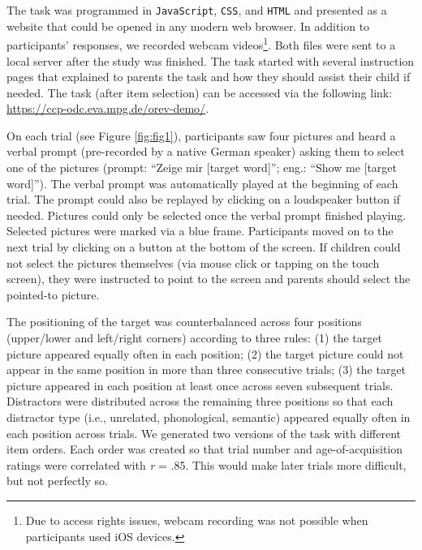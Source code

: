 \documentclass[
  man,floatsintext]{apa6}
\begin{document}
The task was programmed in \texttt{JavaScript}, \texttt{CSS}, and \texttt{HTML} and presented as a website that could be opened in any modern web browser. In addition to participants' responses, we recorded webcam videos\footnote{Due to access rights issues, webcam recording was not possible when participants used iOS devices.}. Both files were sent to a local server after the study was finished. The task started with several instruction pages that explained to parents the task and how they should assist their child if needed. The task (after item selection) can be accessed via the following link: \url{https://ccp-odc.eva.mpg.de/orev-demo/}.

On each trial (see Figure \ref{fig:fig1}), participants saw four pictures and heard a verbal prompt (pre-recorded by a native German speaker) asking them to select one of the pictures (prompt: ``Zeige mir {[}target word{]}''; eng.: ``Show me {[}target word{]}''). The verbal prompt was automatically played at the beginning of each trial. The prompt could also be replayed by clicking on a loudspeaker button if needed. Pictures could only be selected once the verbal prompt finished playing. Selected pictures were marked via a blue frame. Participants moved on to the next trial by clicking on a button at the bottom of the screen. If children could not select the pictures themselves (via mouse click or tapping on the touch screen), they were instructed to point to the screen and parents should select the pointed-to picture.

The positioning of the target was counterbalanced across four positions (upper/lower and left/right corners) according to three rules: (1) the target picture appeared equally often in each position; (2) the target picture could not appear in the same position in more than three consecutive trials; (3) the target picture appeared in each position at least once across seven subsequent trials. Distractors were distributed across the remaining three positions so that each distractor type (i.e., unrelated, phonological, semantic) appeared equally often in each position across trials. We generated two versions of the task with different item orders. Each order was created so that trial number and age-of-acquisition ratings were correlated with \emph{r} = .85. This would make later trials more difficult, but not perfectly so.
\end{document}
